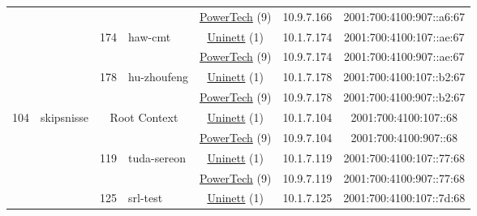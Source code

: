 \begin{small}
\begin{center}
\begin{longtable}{|c|c|c|c|c|c|c|c|}
  &  &  &  & \multicolumn{2}{|c|}{\tiny{\href{http://www.powertech.no}{PowerTech} (9)}} & \tiny{10.9.7.166} & \tiny{2001:700:4100:907::a6:67} \\* \cline{3-3}\cline{4-4}\cline{5-5}\cline{6-6}\cline{7-7}\cline{8-8}
  &  & \multirow{2}{*}{\tiny{174}} & \multicolumn{1}{|l|}{\multirow{2}{*}{\tiny{haw-cmt}}} & \multicolumn{2}{|c|}{\tiny{\href{https://www.uninett.no}{Uninett} (1)}} & \tiny{10.1.7.174} & \tiny{2001:700:4100:107::ae:67} \\* \cline{5-5}\cline{6-6}\cline{7-7}\cline{8-8}
  &  &  &  & \multicolumn{2}{|c|}{\tiny{\href{http://www.powertech.no}{PowerTech} (9)}} & \tiny{10.9.7.174} & \tiny{2001:700:4100:907::ae:67} \\* \cline{3-3}\cline{4-4}\cline{5-5}\cline{6-6}\cline{7-7}\cline{8-8}
  &  & \multirow{2}{*}{\tiny{178}} & \multicolumn{1}{|l|}{\multirow{2}{*}{\tiny{hu-zhoufeng}}} & \multicolumn{2}{|c|}{\tiny{\href{https://www.uninett.no}{Uninett} (1)}} & \tiny{10.1.7.178} & \tiny{2001:700:4100:107::b2:67} \\* \cline{5-5}\cline{6-6}\cline{7-7}\cline{8-8}
  &  &  &  & \multicolumn{2}{|c|}{\tiny{\href{http://www.powertech.no}{PowerTech} (9)}} & \tiny{10.9.7.178} & \tiny{2001:700:4100:907::b2:67} \\ \hline
 \multirow{28}{*}{\tiny{104}} & \multicolumn{1}{|l|}{\multirow{28}{*}{\tiny{skipsnisse}}} & \multicolumn{2}{|c|}{\multirow{2}{*}{\tiny{Root Context}}} & \multicolumn{2}{|c|}{\tiny{\href{https://www.uninett.no}{Uninett} (1)}} & \tiny{10.1.7.104} & \tiny{2001:700:4100:107::68} \\* \cline{5-5}\cline{6-6}\cline{7-7}\cline{8-8}
  &  & \multicolumn{2}{|c|}{} & \multicolumn{2}{|c|}{\tiny{\href{http://www.powertech.no}{PowerTech} (9)}} & \tiny{10.9.7.104} & \tiny{2001:700:4100:907::68} \\* \cline{3-3}\cline{4-4}\cline{5-5}\cline{6-6}\cline{7-7}\cline{8-8}
  &  & \multirow{2}{*}{\tiny{119}} & \multicolumn{1}{|l|}{\multirow{2}{*}{\tiny{tuda-sereon}}} & \multicolumn{2}{|c|}{\tiny{\href{https://www.uninett.no}{Uninett} (1)}} & \tiny{10.1.7.119} & \tiny{2001:700:4100:107::77:68} \\* \cline{5-5}\cline{6-6}\cline{7-7}\cline{8-8}
  &  &  &  & \multicolumn{2}{|c|}{\tiny{\href{http://www.powertech.no}{PowerTech} (9)}} & \tiny{10.9.7.119} & \tiny{2001:700:4100:907::77:68} \\* \cline{3-3}\cline{4-4}\cline{5-5}\cline{6-6}\cline{7-7}\cline{8-8}
  &  & \multirow{2}{*}{\tiny{125}} & \multicolumn{1}{|l|}{\multirow{2}{*}{\tiny{srl-test}}} & \multicolumn{2}{|c|}{\tiny{\href{https://www.uninett.no}{Uninett} (1)}} & \tiny{10.1.7.125} & \tiny{2001:700:4100:107::7d:68} \\* \cline{5-5}\cline{6-6}\cline{7-7}\cline{8-8}

\end{longtable}
\end{center}
\end{small}
